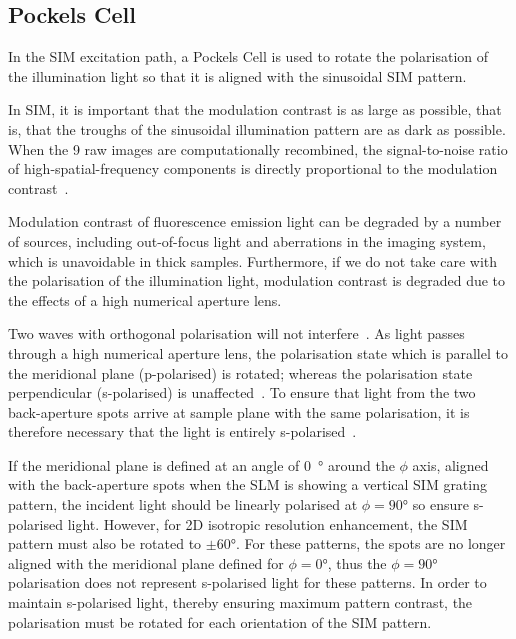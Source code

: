 \subsection{Pockels Cell} \label{sec:lagsim-pockels}
In the SIM excitation path, a Pockels Cell is used to rotate the polarisation of the illumination light so that it is aligned with the sinusoidal SIM pattern. 

In SIM, it is important that the modulation contrast is as large as possible, that is, that the troughs of the sinusoidal illumination pattern are as dark as possible.
When the 9 raw images are computationally recombined, the signal-to-noise ratio of high-spatial-frequency components is directly proportional to the modulation contrast~\cite{oholleran2012polarization}.

Modulation contrast of fluorescence emission light can be degraded by a number of sources, including out-of-focus light and aberrations in the imaging system, which is unavoidable in thick samples. 
Furthermore, if we do not take care with the polarisation of the illumination light,  modulation contrast is degraded due to the effects of a high numerical aperture lens. 

Two waves with orthogonal polarisation will not interfere~\cite{nityananda2013interference}. 
As light passes through a high numerical aperture lens, the polarisation state which is parallel to the meridional plane (p-polarised) is rotated; whereas the polarisation state perpendicular (s-polarised) is unaffected~\cite{mansuripur1991effects}. 
To ensure that light from the two back-aperture spots arrive at sample plane with the same polarisation, it is therefore necessary that the light is entirely s-polarised~\cite{oholleran2012polarization}. 

If the meridional plane is defined at an angle of \SI{0}{\degree} around the $\phi$ axis, aligned with the back-aperture spots when the SLM is showing a vertical SIM grating pattern, the incident light should be linearly polarised at $\phi=90\si{\degree}$ so ensure s-polarised light. 
However, for 2D isotropic resolution enhancement, the SIM pattern must also be rotated to $\pm60\si{\degree}$. 
For these patterns, the spots are no longer aligned with the meridional plane defined for $\phi=0\si{\degree}$, thus the $\phi=90\si{\degree}$ polarisation does not represent s-polarised light for these patterns. 
In order to maintain s-polarised light, thereby ensuring maximum pattern contrast, the polarisation must be rotated for each orientation of the SIM pattern. 

